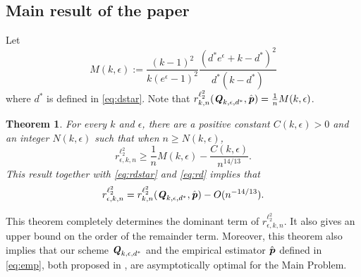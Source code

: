 \documentclass[11pt,onecolumn]{IEEEtran}
\newtheorem{theorem}{Theorem}[section]
\def\mathbi#1{{\textbf{\textit #1}}}
\begin{document}
\subsection{Main result of the paper}
Let 
  \begin{equation}\label{eq:Mke}
     M(k,\epsilon):= \frac{(k-1)^2}{k(e^{\epsilon}-1)^2}\frac{(d^\ast e^{\epsilon} + k-d^\ast)^2 }{d^\ast(k-d^\ast)}
  \end{equation}
where $d^\ast$ is defined in \eqref{eq:dstar}.
Note that 
$r_{k,n}^{\ell_2^2} (\mathbi{Q}_{k,\epsilon,d^\ast}, \hat{\mathbi{p}})
=\frac{1}{n}M(k,\epsilon)$.
     \begin{theorem}\label{Thm:Main}
For every $k$ and $\epsilon$, there are a positive constant $C(k,\epsilon)>0$ and an integer $N(k,\epsilon)$ such that when $n \ge N(k,\epsilon)$,
\begin{equation}\label{eq:cnlb}
r_{\epsilon, k,n}^{\ell_2^2} \ge
\frac 1n M(k,\epsilon)
 - \frac{C(k,\epsilon)} {n^{14/13} }.
\end{equation}
This result together with \eqref{eq:rdstar} and \eqref{eq:rd} implies that
\begin{equation}\label{eq:evob}
r_{\epsilon, k,n}^{\ell_2^2} 
= r_{k,n}^{\ell_2^2} (\mathbi{Q}_{k,\epsilon,d^\ast}, \hat{\mathbi{p}})  -   O ( n^{-14/13} )  .
\end{equation}
\end{theorem}
This theorem completely determines the dominant term of $r_{\epsilon, k,n}^{\ell_2^2}$. It also gives an upper bound on the order of the remainder term. Moreover, this theorem also implies that our scheme
$\mathbi{Q}_{k,\epsilon,d^\ast}$ and the empirical estimator $\hat{\mathbi{p}}$ defined in \eqref{eq:emp}, both proposed in \cite{Ye17}, are asymptotically optimal for the Main Problem.
\end{document}
